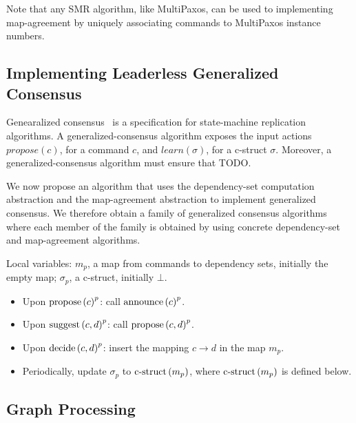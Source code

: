 Note that any SMR algorithm, like MultiPaxos, can be used to implementing map-agreement by uniquely associating commands to MultiPaxos instance numbers.




\subsection{Implementing Leaderless Generalized Consensus}

Genearalized consensus~\cite{Lamport05GeneralizeConsensus} is a specification for state-machine replication algorithms. 
A generalized-consensus algorithm exposes the input actions $propose\left( c \right)$, for a command $c$, and $learn\left( \sigma \right)$, for a c-struct $\sigma$.
Moreover, a generalized-consensus algorithm must ensure that TODO.

We now propose an algorithm that uses the dependency-set computation abstraction and the map-agreement abstraction to implement generalized consensus. We therefore obtain a family of generalized consensus algorithms where each member of the family is obtained by using concrete dependency-set and map-agreement algorithms.


Local variables: $m_p$, a map from commands to dependency sets, initially the empty map; $\sigma_p$, a c-struct, initially $\bot$.
\begin{itemize}[noitemsep,nolistsep]
    \item Upon ${\operatorname{propose}\left( c \right)}^p$: call ${\operatorname{announce}\left( c \right)}^p$.
    \item Upon ${\operatorname{suggest}\left( c,d \right)}^p$: call ${\operatorname{propose}\left( c,d \right)}^p$.
    \item Upon ${\operatorname{decide}\left( c,d \right)}^p$: insert the mapping $c \rightarrow d$ in the map $m_p$.
    \item Periodically, update $\sigma_p$ to $\operatorname{c-struct}\left( m_p \right)$, where $\operatorname{c-struct}\left( m_p \right)$ is defined below.
\end{itemize}

\subsection{Graph Processing}
\label{graph-proc}

